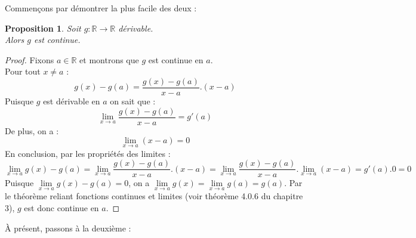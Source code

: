 \documentclass[a4paper,fontsize=13pt]{scrreprt}
\theoremstyle{plain}
\newtheorem{pro}[subsection]{Proposition}
\theoremstyle{definition}
\newcommand{\rr}{\mathbb{R}}
\begin{document}
Commençons par démontrer la plus facile des deux :
\begin{pro} \label{derdonccont}
	Soit $g : \rr \to \rr$ dérivable. \\
Alors $g$ est continue.
\end{pro}
\begin{proof}
Fixons $a \in \rr$ et montrons que $g$ est continue en $a$. \\
Pour tout $x \neq a$ :
$$g(x)-g(a)=\frac{g(x) - g(a)}{x-a}.(x-a)$$
Puisque $g$ est dérivable en $a$ on sait que :
$$\lim\limits_{x \to a} \frac{g(x) - g(a)}{x-a} = g'(a)$$
De plus, on a :
$$\lim\limits_{x \to a} (x-a)=0$$
En conclusion, par les propriétés des limites :
$$\lim\limits_{x \to a} g(x)-g(a)=\lim\limits_{x \to a} \frac{g(x) - g(a)}{x-a}.(x-a) = \lim\limits_{x \to a}\frac{g(x) - g(a)}{x-a} . \lim\limits_{x \to a}(x-a)=g'(a).0=0$$
Puisque $\lim\limits_{x \to a} g(x)-g(a)=0$, on a $\lim\limits_{x \to a} g(x)=\lim\limits_{x \to a} g(a)=g(a)$. Par le théorème reliant fonctions continues et limites (voir théorème 4.0.6 du chapitre 3), $g$ est donc continue en $a$.
\end{proof}

À présent, passons à la deuxième :
\end{document}
